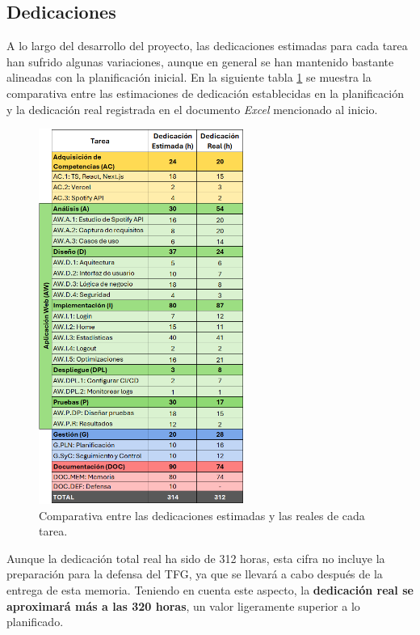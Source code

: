 \subsection{Dedicaciones}

A lo largo del desarrollo del proyecto, las dedicaciones estimadas para cada tarea han sufrido algunas variaciones, aunque en general se han mantenido bastante alineadas con la planificación inicial. En la siguiente tabla \ref{tab:dedicaciones_real} se muestra la comparativa entre las estimaciones de dedicación establecidas en la planificación y la dedicación real registrada en el documento \textit{Excel} mencionado al inicio.

\begin{figure}[H]
    \centering
    \includegraphics[width=0.6\textwidth]{figures/syc/dedicaciones_real.png}
    \vspace{0.5cm}
    \caption{Comparativa entre las dedicaciones estimadas y las reales de cada tarea.}
    \label{tab:dedicaciones_real}
\end{figure}

Aunque la dedicación total real ha sido de 312 horas, esta cifra no incluye la preparación para la defensa del TFG, ya que se llevará a cabo después de la entrega de esta memoria. Teniendo en cuenta este aspecto, la \textbf{dedicación real se aproximará más a las 320 horas}, un valor ligeramente superior a lo planificado.

